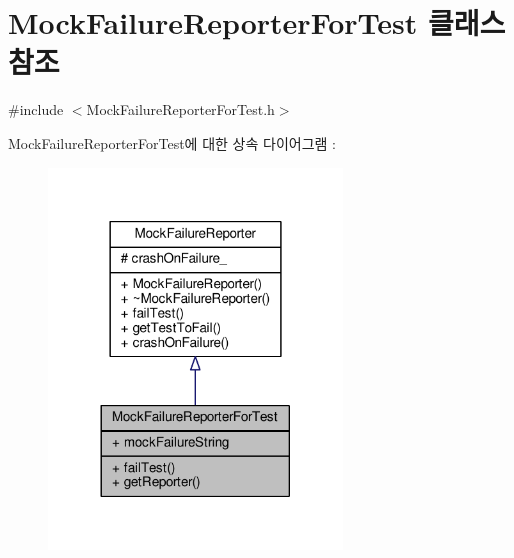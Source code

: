 \hypertarget{class_mock_failure_reporter_for_test}{}\section{Mock\+Failure\+Reporter\+For\+Test 클래스 참조}
\label{class_mock_failure_reporter_for_test}


{\ttfamily \#include $<$Mock\+Failure\+Reporter\+For\+Test.\+h$>$}



Mock\+Failure\+Reporter\+For\+Test에 대한 상속 다이어그램 \+: 
\nopagebreak
\begin{figure}[H]
\begin{center}
\leavevmode
\includegraphics[width=221pt]{class_mock_failure_reporter_for_test__inherit__graph}
\end{center}
\end{figure}



